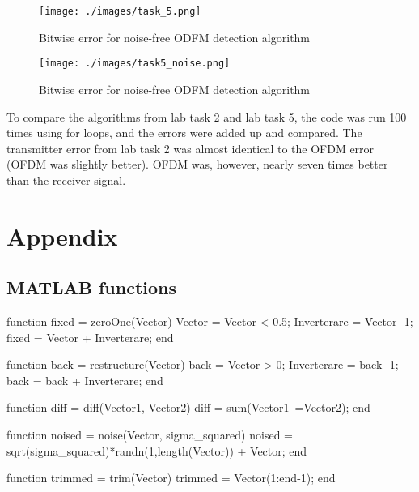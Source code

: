 \documentclass[a4paper,11pt]{article}
\begin{document}
\begin{figure}[H]
    \texttt{[image: ./images/task\_5.png]}
    \caption{Bitwise error for noise-free ODFM detection algorithm}
    \label{fig:my_label}
\end{figure}

\begin{figure}[H]
    \texttt{[image: ./images/task5\_noise.png]}
    \caption{Bitwise error for noise-free ODFM detection algorithm}
    \label{fig:my_label}
\end{figure}

To compare the algorithms from lab task 2 and lab task 5, the code was run 100 times using for loops, and the errors were added up and compared. The transmitter error from lab task 2 was almost identical to the OFDM error (OFDM was slightly better). OFDM was, however, nearly seven times better than the receiver signal.

\pagebreak
\section{Appendix}
\subsection{MATLAB functions}
\begin{ffcode}
function fixed = zeroOne(Vector)
Vector = Vector < 0.5;
Inverterare = Vector -1;
fixed = Vector + Inverterare;
end

function back = restructure(Vector)
back = Vector > 0;
Inverterare = back -1;
back = back + Inverterare;
end

function diff = diff(Vector1, Vector2)
diff = sum(Vector1~=Vector2);
end

function noised = noise(Vector, sigma_squared)
noised = sqrt(sigma_squared)*randn(1,length(Vector)) + Vector;
end

function trimmed = trim(Vector)
trimmed = Vector(1:end-1);
end
\end{ffcode}
\end{document}
